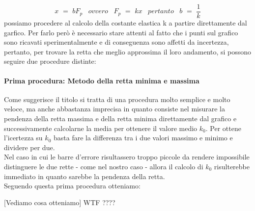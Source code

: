 \begin{equation}
	x \,\,=\,\, bF_p \,\,\,\,\,ovvero\,\,\,\,\, F_p \,\,=\,\, kx \,\,\,\,\,pertanto\,\,\,\,\, b \,\,=\,\, \frac{1}{k}
\end{equation}
possiamo procedere al calcolo della costante elastica k a partire direttamente dal garfico. Per farlo però è necessario stare attenti al fatto che i punti sul grafico sono ricavati sperimentalmente e di conseguenza sono affetti da incertezza, pertanto, per trovare la retta che meglio approssima il loro andamento, si possono seguire due procedure distinte:

\paragraph{Prima procedura: Metodo della retta minima e massima\\}
Come suggerisce il titolo si tratta di una procedura molto semplice e molto veloce, ma anche abbastanza imprecisa in quanto consiste nel misurare la pendenza della retta massima e della retta minima direttamente dal grafico e successivamente calcolarne la media per ottenere il valore medio $k_0$. Per ottene l'icertezza su $k_0$ basta fare la differenza tra i due valori massimo e minimo e dividere per due.\\
Nel caso in cui le barre d'errore risultassero troppo piccole da rendere impossibile distinguere le due rette - come nel nostro caso - allora il calcolo di $k_0$ risulterebbe immediato in quanto sarebbe la pendenza della retta.\\
Seguendo questa prima procedura otteniamo:

[Vediamo cosa otteniamo] WTF ????

